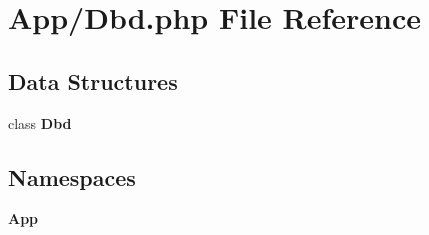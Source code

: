 \section{App/\+Dbd.php File Reference}
\label{_dbd_8php}
\subsection*{Data Structures}
\begin{DoxyCompactItemize}
\item 
class \textbf{ Dbd}
\end{DoxyCompactItemize}
\subsection*{Namespaces}
\begin{DoxyCompactItemize}
\item 
 \textbf{ App}
\end{DoxyCompactItemize}
